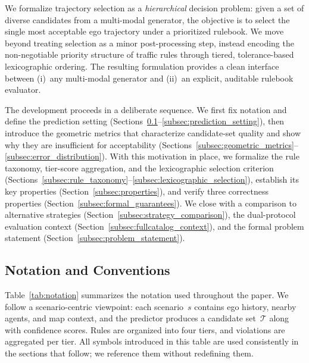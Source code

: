 We formalize trajectory selection as a \emph{hierarchical} decision problem: given a set of diverse candidates from a multi-modal generator, the objective is to select the single most acceptable ego trajectory under a prioritized rulebook.  We move beyond treating selection as a minor post-processing step, instead encoding the non-negotiable priority structure of traffic rules through tiered, tolerance-based lexicographic ordering.  The resulting formulation provides a clean interface between (i)~any multi-modal generator
and (ii)~an explicit, auditable rulebook evaluator.

The development proceeds in a deliberate sequence.  We first fix notation and define the prediction setting (Sections~\ref{subsec:notation}--\ref{subsec:prediction_setting}), then introduce the geometric metrics that characterize candidate-set quality and show why they are insufficient for acceptability (Sections~\ref{subsec:geometric_metrics}--\ref{subsec:error_distribution}). With this motivation in place, we formalize the rule taxonomy, tier-score aggregation, and the lexicographic selection criterion (Sections~\ref{subsec:rule_taxonomy}--\ref{subsec:lexicographic_selection}), establish its key properties (Section~\ref{subsec:properties}), and verify three correctness properties (Section~\ref{subsec:formal_guarantees}).  We close with a comparison to alternative strategies (Section~\ref{subsec:strategy_comparison}), the dual-protocol evaluation context (Section~\ref{subsec:fullcatalog_context}), and the formal problem
statement (Section~\ref{subsec:problem_statement}).

\subsection{Notation and Conventions}
\label{subsec:notation}

Table~\ref{tab:notation} summarizes the notation used throughout the paper. We follow a scenario-centric viewpoint: each scenario~$s$ contains ego history, nearby agents, and map context, and the predictor produces a candidate set~$\mathcal{T}$ along with confidence scores.  Rules are organized into four tiers, and violations are aggregated per tier.  All symbols introduced in this table are used consistently in the sections that follow; we reference them without redefining them.


